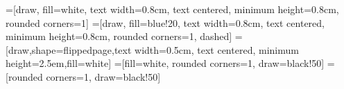 
  \makeatletter

  =[draw, fill=white, text width=0.8cm, text centered,
  minimum height=0.8cm, rounded corners=1]
  =[draw, fill=blue!20, text width=0.8cm, text centered,
  minimum height=0.8cm, rounded corners=1, dashed]
  =[draw,shape=flippedpage,text width=0.5cm, text centered,
  minimum height=2.5em,fill=white]
  =[fill=white, rounded corners=1, draw=black!50]%
  =[rounded corners=1, draw=black!50]%

